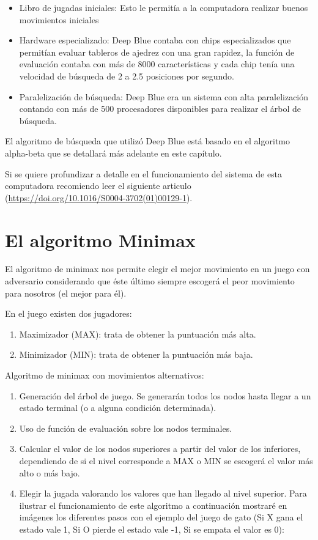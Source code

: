 \documentclass[11pt,fleqn]{book} %
\begin{document}
\begin{itemize}
\item Libro de jugadas iniciales: Esto le permitía a la computadora realizar buenos movimientos iniciales
\item Hardware especializado: Deep Blue contaba con chips especializados que permitían evaluar tableros de ajedrez con una gran rapidez, la función de evaluación contaba con más de 8000 características y cada chip tenía una velocidad de búsqueda de 2 a 2.5 posiciones por segundo.
\item Paralelización de búsqueda: Deep Blue era un sistema con alta paralelización contando con más de 500 procesadores disponibles para realizar el árbol de búsqueda.
\end{itemize}
El algoritmo de búsqueda que utilizó Deep Blue está basado en el algoritmo alpha-beta que se detallará más adelante en este capítulo.

Si se quiere profundizar a detalle en el funcionamiento del sistema de esta computadora recomiendo leer el siguiente articulo (\url{https://doi.org/10.1016/S0004-3702(01)00129-1}). 

\section{El algoritmo Minimax} 

El algoritmo de minimax nos permite elegir el mejor movimiento en un juego con adversario considerando que éste último siempre escogerá el peor movimiento para nosotros (el mejor para él).

En el juego existen dos jugadores:
\begin{enumerate}
\item Maximizador (MAX): trata de obtener la puntuación más alta.
\item Minimizador (MIN): trata de obtener la puntuación más baja.
\end{enumerate}
Algoritmo de minimax con movimientos alternativos:
\begin{enumerate}
\item Generación del árbol de juego. Se generarán todos los nodos hasta llegar a un estado terminal (o a alguna condición determinada).
\item Uso de función de evaluación sobre los nodos terminales.
\item Calcular el valor de los nodos superiores a partir del valor de los inferiores, dependiendo de si el nivel corresponde a MAX o MIN se escogerá el valor más alto o más bajo.
\item Elegir la jugada valorando los valores que han llegado al nivel superior.
Para ilustrar el funcionamiento de este algoritmo a continuación mostraré en imágenes los diferentes pasos con el ejemplo del juego de gato (Si X gana el estado vale 1, Si O pierde el estado vale -1, Si se empata el valor es 0):

\end{enumerate}
\end{document}
